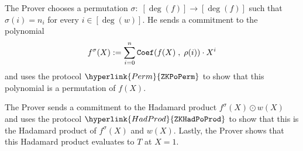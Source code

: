 \documentclass[11pt, lettersize, notitlepage, leqno, footskip=0.6cm]{article}
\newcommand{\bFp}{\mathbb{F}_p}
\newcommand{\lra}{\longrightarrow}
\newcommand{\mb}{\mathbb}
\newcommand{\vs}{\vspace{-0.15cm}}
\newcommand{\noin}{\noindent}
\numberwithin{equation}{section}
\begin{document}
\noin The Prover chooses a permutation $\sigma:\;[\deg(f)]\lra [\deg(f)]$ such that $\sigma(i) = n_i$ for every $i\in [\deg(w)]$. He sends a commitment to the polynomial \vs $$f^{\sigma}(X):= \sum\limits_{i=0}^n {\tt{Coef}}(f(X)\;,\;\rho(i))\cdot X^i $$ and uses the protocol $\hyperlink{Perm}{\tt{ZKPoPerm}}$ to show that this polynomial is a permutation of $f(X)$.


The Prover sends a commitment to the Hadamard product $ f^{\sigma}(X)\odot w(X) $ and uses the protocol $\hyperlink{HadProd}{\tt{ZKHadPoProd}}$ to show that this is the Hadamard product of $f^{\sigma}(X)$ and $w(X)$. Lastly, the Prover shows that this Hadamard product evaluates to $T$ at $X = 1$.



\begin{comment}

\newpage

\section{\fontsize{11}{11}\selectfont Linear transformations}

In this section, we discuss a protocol that proves succinctly and in zero-knowledge that two committed vectors are permutations of each other. More precisely, given commitments to vectors $\mathbf{v}, \mathbf{w}\in \bFp^{n}$ and a commitment to a permutation $\rho\in S_n$, the protocol demonstrates succinctly and in zero-knowledge that $\mathbf{w} = \rho(\mathbf{v})$. 

A permutation $\rho$ is identified with a $n\times n$ \textit{permutation matrix}, i.e. a matrix with the following properties: \vspace{2mm}

\noin - All entries lie in $\{0,1\}$   \vspace{1mm}

\noin - Precisely one entry in each row is $1$ \vspace{1mm}

\noin - Precisely one entry in each column is $1$ \vspace{2mm}

We commit to a permutation by committing to the corresponding permutation matrix. We first discuss how we commit to matrices. We fix a public integer $k$ larger than the dimension of any matrix to be committed and co-prime to $p-1$. 

A square matrix $M = (m_{i,j})_{i,j}$ of dimension $n\times n$ is identified with the polynomial \vs $$M(X):= \sum\limits_{i=0}^{n-1} \sum\limits_{j=0}^{n-1} m_{i,j}\cdot X^{k\cdot i + j} \vs $$  of degree $< k\cdot n$. We \hypertarget{MatCom}{commit to the matrix} $M$ by committing to the polynomial $M(X)$, i.e. \vspace{-2mm} $${ \tt{Com}}(M):= {\tt{Com}}(M(X)) = g_1^{M(s)}\in\mb{G}_1 . $$ We note that this map from $n\times n$ matrices  to polynomials respects Hadamard products, i.e. \vs $$ [M_1\odot M_2](X) = M_1(X)\odot M_2(X).\vs $$


\end{comment}
\end{document}
